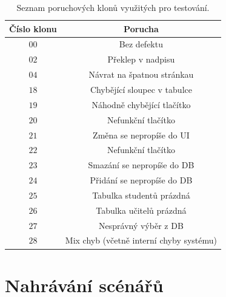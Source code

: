 \documentclass[czech, ma, kiv, he, iso690alph, pdf, viewonly]{fasthesis}
\begin{document}
    \begin{table}
        \begin{tabular}{|c|c|}
            \hline
            \textbf{Číslo klonu} & \textbf{Porucha} \\
            \hline
            \(00\) & Bez defektu \\
            \hline
            \(02\) & Překlep v nadpisu \\
            \hline
            \(04\) & Návrat na špatnou stránkau\\
            \hline
            \(18\) & Chybějící sloupec v tabulce \\
            \hline
            \(19\) & Náhodně chybějící tlačítko \\
            \hline
            \(20\) & Nefunkční tlačítko \\
            \hline
            \(21\) & Změna se nepropíše do UI \\
            \hline
            \(22\) & Nefunkční tlačítko \\
            \hline
            \(23\) & Smazání se nepropíše do DB \\
            \hline
            \(24\) & Přidání se nepropíše do DB \\
            \hline
            \(25\) & Tabulka studentů prázdná \\
            \hline
            \(26\) & Tabulka učitelů prázdná \\
            \hline
            \(27\) & Nesprávný výběr z DB \\
            \hline
            \(28\) & Mix chyb (včetně interní chyby systému) \\
            \hline
        \end{tabular}
        \centering
        \label{tab:clones}
        \caption{Seznam poruchových klonů využitých pro testování.}
    \end{table}

    \section{Nahrávání scénářů}
\end{document}
